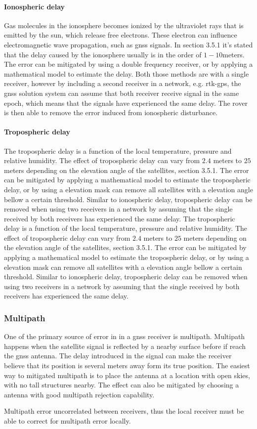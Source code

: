 \paragraph{Ionospheric delay}
Gas molecules in the ionosphere becomes ionized by the ultraviolet rays that is emitted by the sun, which release free electrons. These electron can influence electromagnetic wave propagation, such as \gls{gnss} signals. In \citep{vik2014integrated} section 3.5.1 it's stated that the delay caused by the ionosphere usually is in the order of $1-10 $meters. The error can be mitigated by using a double frequency receiver, or by applying a mathematical model to estimate the delay. Both those methods are with a single receiver, however by including a second receiver in a network, e.g. \gls{rtk-gps}, the \gls{gnss} solution system can assume that both receiver receive signal in the same epoch, which means that the signals have experienced the same delay. The rover is then able to remove the error induced from ionospheric disturbance.
\paragraph{Tropospheric delay}
The tropospheric delay is a function of the local temperature, pressure and relative humidity. The effect of tropospheric delay can  vary from $2.4$ meters to $25$ meters depending on the elevation angle of the satellites,\citep{vik2014integrated} section 3.5.1. The error can be mitigated by applying a mathematical model to estimate the tropospheric delay, or by using a elevation mask can remove all satellites with a elevation angle bellow a certain threshold. Similar to ionospheric delay, tropospheric delay can be removed when using two receivers in a network by assuming that the single received by both receivers has experienced the same delay. 
The tropospheric delay is a function of the local temperature, pressure and relative humidity. The effect of tropospheric delay can  vary from $2.4$ meters to $25$ meters depending on the elevation angle of the satellites,\citep{vik2014integrated} section 3.5.1. The error can be mitigated by applying a mathematical model to estimate the tropospheric delay, or by using a elevation mask can remove all satellites with a elevation angle bellow a certain threshold. Similar to ionospheric delay, tropospheric delay can be removed when using two receivers in a network by assuming that the single received by both receivers has experienced the same delay. 

\subsubsection{Multipath}
One of the primary source of error in in a \gls{gnss} receiver is multipath. Multipath happens when the satellite signal is reflected by a nearby surface before if reach the \gls{gnss} antenna. The delay introduced in the signal can make the receiver believe that its position is several meters away form its true position. The easiest way to mitigated multipath is to place the antenna at a location with open skies, with no tall structures nearby. The effect can also be mitigated by choosing a antenna with good multipath rejection capability.

Multipath error uncorrelated between receivers, thus the local receiver must be able to correct for multipath error locally.
\cleardoublepage
